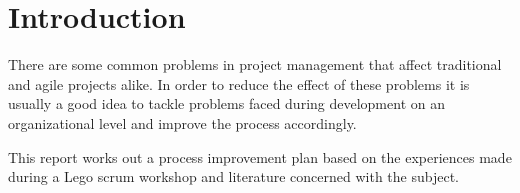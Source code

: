 \section{Introduction}
\label{sec:intro}

There are some common problems in project management that affect traditional and agile projects alike. In order to reduce the effect of these problems it is usually a good idea to tackle problems faced during development on an organizational level and improve the process accordingly.

This report works out a process improvement plan based on the experiences made during a Lego scrum workshop and literature concerned with the subject.